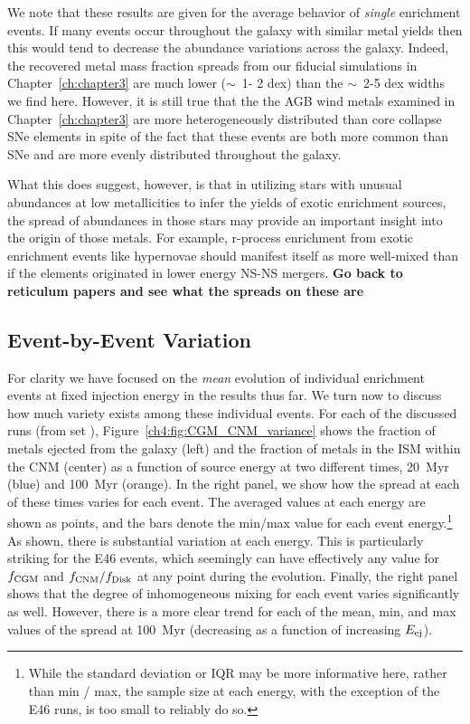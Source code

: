 We note that these results are given for the average behavior of \textit{single} enrichment events. If many events occur throughout the galaxy with similar metal yields then this would tend to decrease the abundance variations across the galaxy. Indeed, the recovered metal mass fraction spreads from our fiducial simulations in Chapter~\ref{ch:chapter3} are much lower ($\sim$~1- 2 dex) than the $\sim$~2-5 dex widths we find here. However, it is still true that the the AGB wind metals examined in Chapter~\ref{ch:chapter3} are more heterogeneously distributed than core collapse SNe elements in spite of the fact that these events are both more common than SNe and are more evenly distributed throughout the galaxy.

What this does suggest, however, is that in utilizing stars with unusual abundances at low metallicities to infer the yields of exotic enrichment sources, the spread of abundances in those stars may provide an important insight into the origin of those metals. For example, r-process enrichment from exotic enrichment events like hypernovae should manifest itself as more well-mixed than if the elements originated in lower energy NS-NS mergers.
\textbf{Go back to reticulum papers and see what the spreads on these are}


\subsection{Event-by-Event Variation}
\label{ch4:sec:individual event variation}

For clarity we have focused on the \textit{mean} evolution of individual enrichment events at fixed injection energy in the results thus far. We turn now to discuss how much variety exists among these individual events. For each of the discussed runs (from set \runonenu), Figure~\ref{ch4:fig:CGM_CNM_variance} shows the fraction of metals ejected from the galaxy (left) and the fraction of metals in the ISM within the CNM (center) as a function of source energy at two different times, 20~Myr (blue) and 100~Myr (orange). In the right panel, we show how the spread at each of these times varies for each event. The averaged values at each energy are shown as points, and the bars denote the min/max value for each event energy.\footnote{While the standard deviation or IQR may be more informative here, rather than min / max, the sample size at each energy, with the exception of the E46 runs, is too small to reliably do so.} As shown, there is substantial variation at each energy. This is particularly striking for the E46 events, which seemingly can have effectively any value for $f_{\rm CGM}$ and $f_{\rm CNM} / f_{\rm Disk}$ at any point during the evolution. Finally, the right panel shows that the degree of inhomogeneous mixing for each event varies significantly as well. However, there is a more clear trend for each of the mean, min, and max values of the spread at 100~Myr (decreasing as a function of increasing $E_{\rm ej}$).



